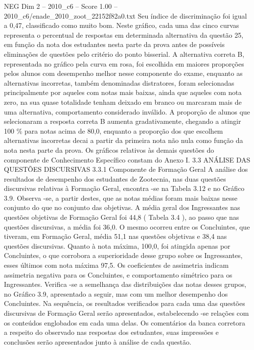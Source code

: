 \begin{textsample}{NEG Dim 2 – 2010\_c6 – Score 1.00 – 2010\_c6/enade\_2010\_zoot\_22152f82a0.txt}
Seu índice de discriminação foi igual a 0,47, classificado como muito bom.
Neste gráfico, cada uma das cinco curvas representa o percentual de respostas em determinada alternativa da questão 25, em função da nota dos estudantes nesta parte da prova antes de possíveis eliminações de questões pelo critério do ponto bisserial.
A alternativa correta B, representada no gráfico pela curva em rosa, foi escolhida em maiores proporções pelos alunos com desempenho melhor nesse componente do exame, enquanto as alternativas incorretas, também denominadas distratores, foram selecionadas principalmente por aqueles com notas mais baixas, ainda que aqueles com nota zero, na sua quase totalidade tenham deixado em branco ou marcaram mais de uma alternativa, comportamento considerado inválido.
A proporção de alunos que selecionaram a resposta correta B aumenta gradativamente, chegando a atingir 100 \% para notas acima de 80,0, enquanto a proporção dos que escolhem alternativas incorretas decai a partir da primeira nota não nula como função da nota nesta parte da prova.
Os gráficos relativos às demais questões do componente de Conhecimento Específico constam do Anexo I. 3.3 ANÁLISE DAS QUESTÕES DISCURSIVAS 3.3.1 Componente de Formação Geral A análise dos resultados de desempenho dos estudantes de Zootecnia, nas duas questões discursivas relativas à Formação Geral, encontra -se na Tabela 3.12 e no Gráfico 3.9.
Observa -se, a partir destes, que as notas médias foram mais baixas nesse conjunto do que no conjunto das objetivas.
A média geral dos Ingressantes nas questões objetivas de Formação Geral foi 44,8 ( Tabela 3.4 ), ao passo que nas questões discursivas, a média foi 36,0.
O mesmo ocorreu entre os Concluintes, que tiveram, em Formação Geral, média 51,1 nas questões objetivas e 38,4 nas questões discursivas.
Quanto à nota máxima, 100,0, foi atingida apenas por Concluintes, o que corrobora a superioridade desse grupo sobre os Ingressantes, esses últimos com nota máxima 97,5.
Os coeficientes de assimetria indicam assimetria negativa para os Concluintes, e comportamento simétrico para os Ingressantes.
Verifica -se a semelhança das distribuições das notas desses grupos, no Gráfico 3.9, apresentado a seguir, mas com um melhor desempenho dos Concluintes.
Na sequência, os resultados verificados para cada uma das questões discursivas de Formação Geral serão apresentados, estabelecendo -se relações com os conteúdos englobados em cada uma delas.
Os comentários da banca corretora a respeito do observado nas respostas dos estudantes, suas impressões e conclusões serão apresentados junto à análise de cada questão.

\end{textsample}
